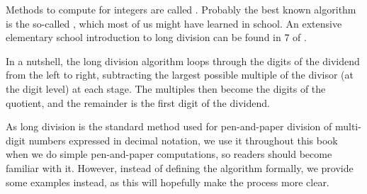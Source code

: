 Methods to compute  for integers are called . Probably the best known algorithm is the so-called , which most of us might have learned in school. An extensive elementary school introduction to long division can be found in \chaptname{} 7 of \cite{wu-1}.

In a nutshell, the long division algorithm loops through the digits of the dividend from the left to right, subtracting the largest possible multiple of the divisor (at the digit level) at each stage. The multiples then become the digits of the quotient, and the remainder is the first digit of the dividend.

As long division is the standard method used for pen-and-paper division of multi-digit numbers expressed in decimal notation, we use it throughout this book when we do simple pen-and-paper computations, so readers should become familiar with it. However, instead of defining the algorithm formally, we  provide some examples instead, as this will hopefully make the process more clear.

